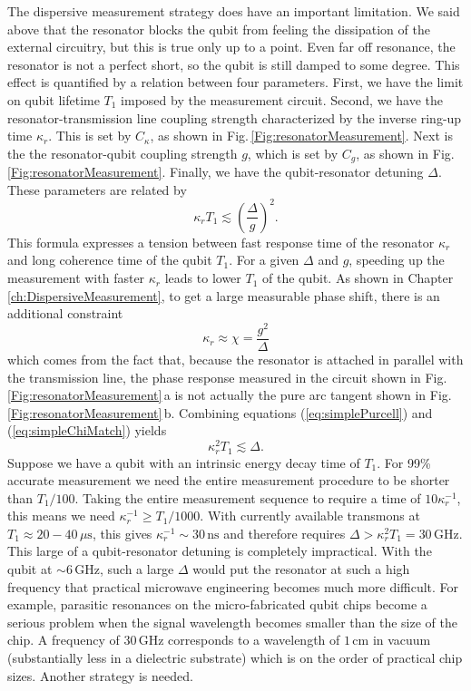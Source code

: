 The dispersive measurement strategy does have an important limitation. We said above that the resonator blocks the qubit from feeling the dissipation of the external circuitry, but this is true only up to a point.
Even far off resonance, the resonator is not a perfect short, so the qubit is still damped to some degree.
This effect is quantified by a relation between four parameters.
First, we have the limit on qubit lifetime $T_1$ imposed by the measurement circuit.
Second, we have the resonator-transmission line coupling strength characterized by the inverse ring-up time $\kappa_r$.
This is set by $C_{\kappa}$, as shown in Fig.\,\ref{Fig:resonatorMeasurement}.
Next is the the resonator-qubit coupling strength $g$, which is set by $C_g$, as shown in Fig.\,\ref{Fig:resonatorMeasurement}.
Finally, we have the qubit-resonator detuning $\Delta$.
These parameters are related by \cite{Blais:cQED2004} \begin{equation}
\kappa_r T_1 \lesssim \left( \frac{\Delta}{g} \right) ^2 . \label{eq:simplePurcell} \end{equation}
This formula expresses a tension between fast response time of the resonator $\kappa_r$ and long coherence time of the qubit $T_1$.
For a given $\Delta$ and $g$, speeding up the measurement with faster $\kappa_r$ leads to lower $T_1$ of the qubit.
As shown in Chapter \ref{ch:DispersiveMeasurement}, to get a large measurable phase shift, there is an additional constraint \begin{equation}
\kappa_r \approx \chi = \frac{g^2}{\Delta} \label{eq:simpleChiMatch} \end{equation}
which comes from the fact that, because the resonator is attached in parallel with the transmission line, the phase response measured in the circuit shown in Fig.\,\ref{Fig:resonatorMeasurement}\,a is not actually the pure arc tangent shown in Fig.\,\ref{Fig:resonatorMeasurement}\,b. Combining equations (\ref{eq:simplePurcell}) and (\ref{eq:simpleChiMatch}) yields \begin{equation}
\kappa_r^2 T_1 \lesssim \Delta . \end{equation}
Suppose we have a qubit with an intrinsic energy decay time of $T_1$.
For 99\% accurate measurement we need the entire measurement procedure to be shorter than $T_1/100$.
Taking the entire measurement sequence to require a time of $10\kappa_r^{-1}$, this means we need $\kappa_r^{-1} \geq T_1 / 1000$.
With currently available transmons at $T_1 \approx 20-40\,\mu\textrm{s}$, this gives $\kappa_r^{-1} \sim 30\,\textrm{ns}$ and therefore requires $\Delta > \kappa_r^2 T_1 = 30\,\textrm{GHz}$.
This large of a qubit-resonator detuning is completely impractical.
With the qubit at $\sim 6\,\text{GHz}$, such a large $\Delta$ would put the resonator at such a high frequency that practical microwave engineering becomes much more difficult.
For example, parasitic resonances on the micro-fabricated qubit chips become a serious problem when the signal wavelength becomes smaller than the size of the chip.
A frequency of $30\,\textrm{GHz}$ corresponds to a wavelength of $1\,\textrm{cm}$ in vacuum (substantially less in a dielectric substrate) which is on the order of practical chip sizes.
Another strategy is needed.

